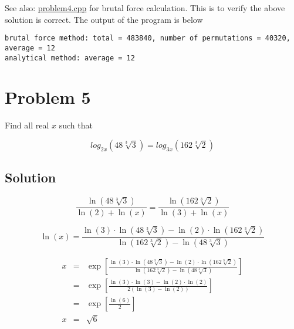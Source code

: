 \documentclass[11pt]{article}
\begin{document}
See also: \href{https://github.com/xuanni/Problems/blob/master/problem4.cpp}{problem4.cpp} for brutal force calculation. This is to verify the above solution is correct. The output of the program is below
\begin{verbatim}
brutal force method: total = 483840, number of permutations = 40320, average = 12
analytical method: average = 12
\end{verbatim}

\section{Problem 5}
\label{sec:org938cf7c}
Find all real \(x\) such that

\begin{equation}
log_{2x}(48\sqrt[3]{3}) = log_{3x}(162\sqrt[3]{2})
\end{equation}

\subsection{Solution}
\label{sec:orga25d74d}
\begin{equation}
\frac{\ln(48\sqrt[3]{3})}{\ln(2) + \ln(x)} = \frac{\ln(162\sqrt[3]{2})}{\ln(3) + \ln(x)}
\end{equation}

\begin{equation}
\ln(x) = \frac{\ln(3)\cdot \ln(48\sqrt[3]{3}) - \ln(2)\cdot \ln(162\sqrt[3]{2})}{\ln(162\sqrt[3]{2}) - \ln(48\sqrt[3]{3})}
\end{equation}


\begin{eqnarray}
x &=& \exp\left[ \frac{\ln(3)\cdot \ln(48\sqrt[3]{3}) - \ln(2)\cdot \ln(162\sqrt[3]{2})}{\ln(162\sqrt[3]{2}) - \ln(48\sqrt[3]{3})}\right]\\
&=& \exp\left[\frac{\ln(3)\cdot\ln(3)-\ln(2)\cdot\ln(2)}{2(\ln(3)-\ln(2))}\right]\\
&=& \exp\left[\frac{\ln(6)}{2}\right]\\
x&=& \sqrt{6}
\end{eqnarray}
\end{document}
